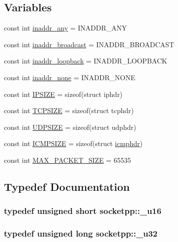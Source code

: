 \subsection*{Variables}
\begin{CompactItemize}
\item 
const int \hyperlink{namespacesocketpp_5200e43bde971e8003068a622cba2f58}{inaddr\_\-any} = INADDR\_\-ANY
\item 
const int \hyperlink{namespacesocketpp_733551c5151802fc12691a868a366a5f}{inaddr\_\-broadcast} = INADDR\_\-BROADCAST
\item 
const int \hyperlink{namespacesocketpp_8a9e04cf907ec163f43cf6c3bf9e213c}{inaddr\_\-loopback} = INADDR\_\-LOOPBACK
\item 
const int \hyperlink{namespacesocketpp_26bb72049a9cf272f6c116b0a2187c0b}{inaddr\_\-none} = INADDR\_\-NONE
\item 
const int \hyperlink{namespacesocketpp_1beda002d2e23bf757355444fd9279e2}{IPSIZE} = sizeof(struct iphdr)
\item 
const int \hyperlink{namespacesocketpp_34c3bb51b882d2ae59d483d1e8faeebd}{TCPSIZE} = sizeof(struct tcphdr)
\item 
const int \hyperlink{namespacesocketpp_1c4f449aef7a6c706b546343c4d16dd3}{UDPSIZE} = sizeof(struct udphdr)
\item 
const int \hyperlink{namespacesocketpp_fa361b148e87f58b86a95abc48e281fb}{ICMPSIZE} = sizeof(struct \hyperlink{structsocketpp_1_1icmphdr}{icmphdr})
\item 
const int \hyperlink{namespacesocketpp_11f9a39ced6614326ba993c3245d8912}{MAX\_\-PACKET\_\-SIZE} = 65535
\end{CompactItemize}


\subsection{Typedef Documentation}
\hypertarget{namespacesocketpp_0d48e817f00cbb84d07faec41ee4b169}{
\subsubsection[{\_\-u16}]{\setlength{\rightskip}{0pt plus 5cm}typedef unsigned short {\bf socketpp::\_\-u16}}}
\label{namespacesocketpp_0d48e817f00cbb84d07faec41ee4b169}


\hypertarget{namespacesocketpp_d9c3b2ad093bb5814af59760e0a2192a}{
\subsubsection[{\_\-u32}]{\setlength{\rightskip}{0pt plus 5cm}typedef unsigned long {\bf socketpp::\_\-u32}}}
\label{namespacesocketpp_d9c3b2ad093bb5814af59760e0a2192a}


